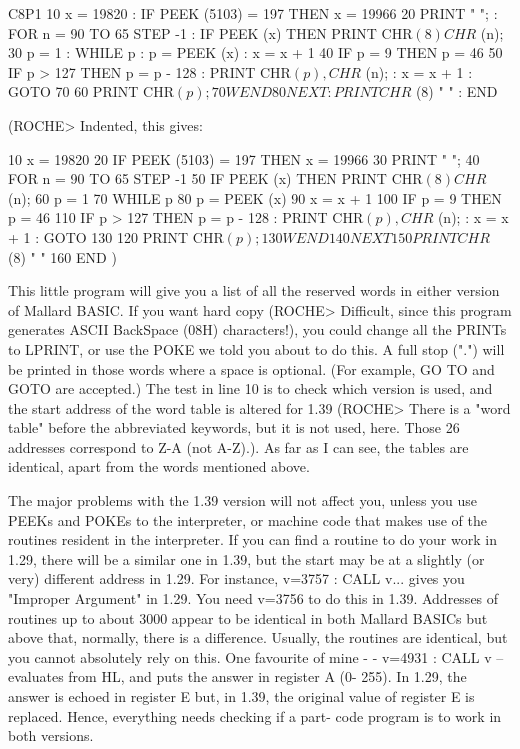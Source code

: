         C8P1
        10 x = 19820 : IF PEEK (5103) = 197 THEN x = 19966
        20 PRINT " "; : FOR n = 90 TO 65 STEP -1 : IF PEEK (x) THEN PRINT CHR$ 
(8) CHR$ (n);
        30 p = 1 : WHILE p : p = PEEK (x) : x = x + 1
        40 IF p = 9 THEN p = 46
        50 IF p > 127 THEN p = p - 128 : PRINT CHR$ (p), CHR$ (n); : x = x + 1 
: GOTO 70
        60 PRINT CHR$ (p);
        70 WEND
        80 NEXT : PRINT CHR$ (8) " " : END

(ROCHE> Indented, this gives:

        10 x = 19820
        20 IF PEEK (5103) = 197 THEN x = 19966
        30 PRINT " ";
        40 FOR n = 90 TO 65 STEP -1
        50     IF PEEK (x) THEN PRINT CHR$ (8) CHR$ (n);
        60     p = 1
        70     WHILE p
        80           p = PEEK (x)
        90           x = x + 1
        100          IF p = 9 THEN p = 46
        110          IF p > 127 THEN p = p - 128 : PRINT CHR$ (p), CHR$ (n); : 
x = x + 1 : GOTO 130
        120          PRINT CHR$ (p);
        130    WEND
        140 NEXT
        150 PRINT CHR$ (8) " "
        160 END
)

This  little program will give you a list of all the reserved words in  either 
version of Mallard BASIC. If you want hard copy (ROCHE> Difficult, since  this 
program generates ASCII BackSpace (08H) characters!), you could change all the 
PRINTs  to LPRINT, or use the POKE we told you about to do this. A  full  stop 
(".") will be printed in those words where a space is optional. (For  example, 
GO TO and GOTO are accepted.) The test in line 10 is to check which version is 
used,  and  the start address of the word table is altered  for  1.39  (ROCHE> 
There  is a "word table" before the abbreviated keywords, but it is not  used, 
here.  Those 26 addresses correspond to Z-A (not A-Z).). As far as I can  see, 
the tables are identical, apart from the words mentioned above.

The  major problems with the 1.39 version will not affect you, unless you  use 
PEEKs  and  POKEs to the interpreter, or machine code that makes  use  of  the 
routines  resident  in the interpreter. If you can find a routine to  do  your 
work  in 1.29, there will be a similar one in 1.39, but the start may be at  a 
slightly (or very) different address in 1.29. For instance, v=3757 : CALL v... 
gives  you  "Improper Argument" in 1.29. You need v=3756 to do this  in  1.39. 
Addresses of routines up to about 3000 appear to be identical in both  Mallard 
BASICs but above that, normally, there is a difference. Usually, the  routines 
are identical, but you cannot absolutely rely on this. One favourite of mine -
- v=4931 : CALL v -- evaluates from HL, and puts the answer in register A  (0-
255).  In 1.29, the answer is echoed in register E but, in 1.39, the  original 
value  of register E is replaced. Hence, everything needs checking if a  part-
code program is to work in both versions.

